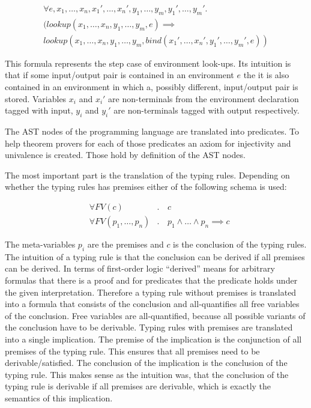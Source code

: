 \begin{multline}
  \forall e, x_1, \dots, x_n, x_1', \dots, x_n', y_1, \dots, y_m, y_1', \dots,
  y_m' . \\
  (lookup(x_1, \dots, x_n, y_1, \dots, y_m, e) \implies \\ lookup(x_1,
  \dots, x_n, y_1, \dots, y_m, bind(x_1',\dots,x_n',y_1',\dots,y_m',e))
\end{multline}

This formula represents the step case of environment look-ups. Its
intuition is that if some input/output pair is contained in an
environment $e$ the it is also contained in an environment in which a,
possibly different, input/output pair is stored. Variables $x_i$ and
$x_i'$ are non-terminals from the environment declaration tagged with
input, $y_i$ and $y_i'$ are non-terminals tagged with output
respectively.

The AST nodes of the programming language are translated into
predicates. To help theorem provers for each of those predicates an
axiom for injectivity and univalence is created. Those hold by
definition of the AST nodes.

The most important part is the translation of the typing
rules. Depending on whether the typing rules has premises either of
the following schema is used:

\begin{align}
  &\forall FV(c) &.\,& c \\
  &\forall FV(p_1,\dots, p_n) &.\,& p_1 \land \dots \land p_n \implies c
\end{align}

The meta-variables $p_i$ are the premises and $c$ is the conclusion of
the typing rules. The intuition of a typing rule is that the
conclusion can be derived if all premises can be derived. In terms of
first-order logic ``derived'' means for arbitrary formulas that there
is a proof and for predicates that the predicate holds under the given
interpretation. Therefore a typing rule without premises is translated
into a formula that consists of the conclusion and all-quantifies all
free variables of the conclusion. Free variables are all-quantified,
because all possible variants of the conclusion have to be derivable.
Typing rules with premises are translated into a single
implication. The premise of the implication is the conjunction of all
premises of the typing rule. This ensures that all premises need to be
derivable/satisfied. The conclusion of the implication is the
conclusion of the typing rule. This makes sense as the intuition was,
that the conclusion of the typing rule is derivable if all premises
are derivable, which is exactly the semantics of this implication.

